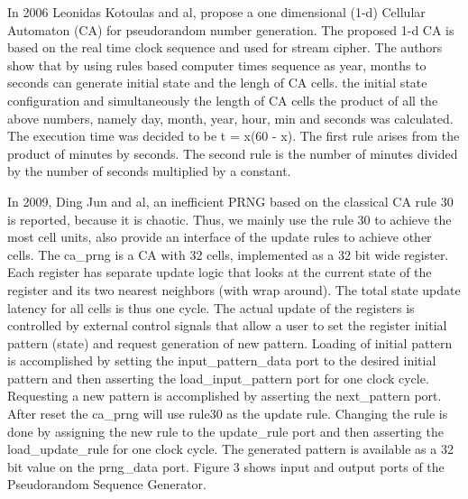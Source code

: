 In 2006 Leonidas Kotoulas and al, propose a one dimensional (1-d) Cellular Automaton (CA) for pseudorandom number generation. The proposed 1-d CA is based on the real time clock sequence and used for stream cipher. The authors show that by using rules based computer times sequence as year, months to seconds can generate initial state and the lengh of CA cells. the initial state configuration and simultaneously the length of CA cells the product of all the above numbers, namely day, month, year, hour, min and seconds was calculated. The execution time was decided to be t = x(60 - x). The first rule arises from the product of minutes by seconds. The second rule is the number of minutes divided by the number of seconds multiplied by a constant.

In 2009, Ding Jun and al, an inefficient PRNG based on the classical CA rule 30 is reported, because it is chaotic. Thus, we mainly use the rule 30 to achieve the most cell units, also provide an interface of the update rules to achieve other cells.
The ca_prng is a CA with 32 cells, implemented as a 32 bit wide register. Each register has separate update logic that looks at the current state of the register and its two nearest neighbors (with wrap around). The total state update latency for all cells is thus one cycle. The actual update of the registers is controlled by external control signals that allow a user to set the register initial pattern (state) and request generation of new pattern. Loading of initial pattern is accomplished by setting the input_pattern_data port to the desired initial pattern and then asserting the load_input_pattern port for one clock cycle. Requesting a new pattern is accomplished by asserting the next_pattern port. After reset the ca_prng will use rule30 as the update rule. Changing the rule is done by assigning the new rule to the update_rule port and then asserting the load_update_rule for one clock cycle. The generated pattern is available as a 32 bit value on the prng_data port. Figure 3 shows input and output ports of the Pseudorandom Sequence Generator.

